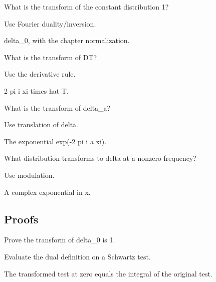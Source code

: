 \begin{exercise}\label{exr:iii19-expand-02}
What is the transform of the constant distribution 1?
\end{exercise}
\begin{hint}
Use Fourier duality/inversion.
\end{hint}
\begin{solution}
delta\_0, with the chapter normalization.
\end{solution}

\begin{exercise}[Derivative]\label{exr:iii19-expand-03}
What is the transform of DT?
\end{exercise}
\begin{hint}
Use the derivative rule.
\end{hint}
\begin{solution}
2 pi i xi times hat T.
\end{solution}

\begin{exercise}\label{exr:iii19-expand-04}
What is the transform of delta\_a?
\end{exercise}
\begin{hint}
Use translation of delta.
\end{hint}
\begin{solution}
The exponential exp(-2 pi i a xi).
\end{solution}

\begin{exercise}\label{exr:iii19-expand-05}
What distribution transforms to delta at a nonzero frequency?
\end{exercise}
\begin{hint}
Use modulation.
\end{hint}
\begin{solution}
A complex exponential in x.
\end{solution}

\subsection*{Proofs}

\begin{exercise}\label{exr:iii19-expand-06}
Prove the transform of delta\_0 is 1.
\end{exercise}
\begin{hint}
Evaluate the dual definition on a Schwartz test.
\end{hint}
\begin{solution}
The transformed test at zero equals the integral of the original test.
\end{solution}

